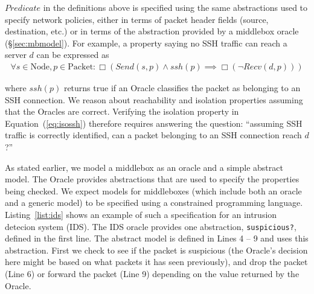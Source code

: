 $Predicate$ in the definitions above is specified using the same abstractions used to specify network policies, \ie either in terms of packet
header fields (source, destination, etc.) or in terms of the abstraction provided by a middlebox oracle (\S\ref{sec:mbmodel}). For example, a property
saying no SSH traffic can reach a server $d$ can be expressed as
\begin{align}
\forall s\in \text{Node}, p\in \text{Packet}: \Box (Send(s, p) \land ssh(p) \implies \Box(\neg Recv(d, p))) \label{eq:isossh}
\end{align}

where $ssh(p)$ returns true if an Oracle classifies the packet as belonging to an SSH connection.
We reason about reachability and isolation properties assuming that the Oracles are correct.
Verifying the isolation property in Equation~(\ref{eq:isossh}) therefore requires answering the question:
``assuming SSH traffic is correctly identified, can a packet belonging to an SSH connection reach $d$?''


As stated earlier, we model a middlebox as an oracle and a simple abstract model. The Oracle provides abstractions that are used to specify the
properties being checked. We expect models for middleboxes (which include both an oracle and a generic model) to be specified
using a constrained programming language. Listing~\ref{list:ids} shows an example of such a specification
for an intrusion detecion system (IDS). The IDS oracle provides one abstraction, \texttt{suspicious?}, defined in the first line. The abstract model is
defined in Lines 4 -- 9 and uses this abstraction. First we check to see if the packet is suspicious (the Oracle's decision here might be based on what
packets it has seen previously), and  drop the packet (Line 6) or forward the packet (Line 9) depending on the value returned by the Oracle.

